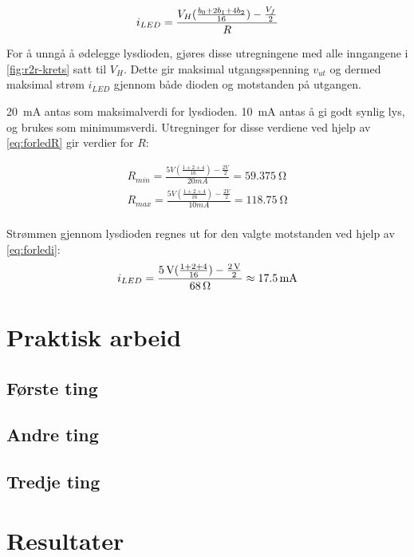 \documentclass[11pt,a4paper,twocolumn]{article}
\begin{document}
\begin{equation}
\label{eq:forledi}
i_{LED} = \frac{V_H(\frac{b_0 + 2b_1 + 4b_2}{16}) - \frac{V_f}{2}}{R} \\
\end{equation}

For å unngå å ødelegge lysdioden, gjøres disse utregningene med alle inngangene i \cref{fig:r2r-krets} satt til $V_H$. Dette gir maksimal utgangsspenning $v_{ut}$ og dermed maksimal strøm $i_{LED}$ gjennom både dioden og motstanden på utgangen.

\medskip

\qty{20}{\milli\ampere} antas som maksimalverdi for lysdioden. \qty{10}{\milli\ampere} antas å gi godt synlig lys, og brukes som minimumsverdi. Utregninger for disse verdiene ved hjelp av \cref{eq:forledR} gir verdier for $R$:

$$
\begin{aligned}
R_{min} = \frac{5V(\frac{1 + 2 + 4}{16}) - \frac{2V}{2}}{20mA} = \qty{59.375}{\ohm} \\
R_{max} = \frac{5V(\frac{1 + 2 + 4}{16}) - \frac{2V}{2}}{10mA} = \qty{118.75}{\ohm} \\
\end{aligned}
$$

Strømmen gjennom lysdioden regnes ut for den valgte motstanden ved hjelp av \cref{eq:forledi}:
$$
i_{LED} = \frac{\qty{5}{\volt}(\frac{1 + 2 + 4}{16}) - \frac{ \qty{2}{\volt} }{2} }{ \qty{68}{\ohm} } \approx \qty{17.5}{\milli\ampere} \\
$$

\section{Praktisk arbeid}

\subsection{Første ting}
\subsection{Andre ting}
\subsection{Tredje ting}

\section{Resultater}
\end{document}
